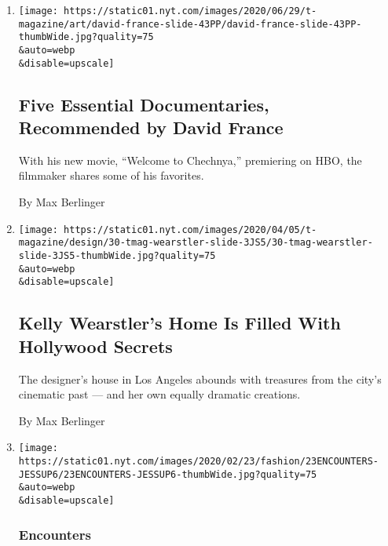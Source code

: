 \begin{enumerate}
\def\labelenumi{\arabic{enumi}.}
\item
  \href{/2020/06/29/t-magazine/david-france-documentary-watch-list.html}{}

  \texttt{[image: https://static01.nyt.com/images/2020/06/29/t-magazine/art/david-france-slide-43PP/david-france-slide-43PP-thumbWide.jpg?quality=75\\\&auto=webp\\\&disable=upscale]}

  \hypertarget{five-essential-documentaries-recommended-by-david-france}{%
  \subsection{Five Essential Documentaries, Recommended by David
  France}\label{five-essential-documentaries-recommended-by-david-france}}

  With his new movie, ``Welcome to Chechnya,'' premiering on HBO, the
  filmmaker shares some of his favorites.

  By Max Berlinger
\item
  \href{/2020/03/31/t-magazine/kelly-wearstler-home.html}{}

  \texttt{[image: https://static01.nyt.com/images/2020/04/05/t-magazine/design/30-tmag-wearstler-slide-3JS5/30-tmag-wearstler-slide-3JS5-thumbWide.jpg?quality=75\\\&auto=webp\\\&disable=upscale]}

  \hypertarget{kelly-wearstlers-home-is-filled-with-hollywood-secrets}{%
  \subsection{Kelly Wearstler's Home Is Filled With Hollywood
  Secrets}\label{kelly-wearstlers-home-is-filled-with-hollywood-secrets}}

  The designer's house in Los Angeles abounds with treasures from the
  city's cinematic past --- and her own equally dramatic creations.

  By Max Berlinger
\item
  \href{/2020/02/21/style/connor-jessup-of-locke-key-gets-his-nails-done.html}{}

  \texttt{[image: https://static01.nyt.com/images/2020/02/23/fashion/23ENCOUNTERS-JESSUP6/23ENCOUNTERS-JESSUP6-thumbWide.jpg?quality=75\\\&auto=webp\\\&disable=upscale]}

  \hypertarget{encounters}{%
  \subsubsection{Encounters}\label{encounters}}


\end{enumerate}
